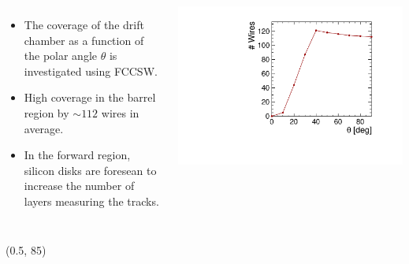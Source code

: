 \documentclass[final,xcolor={dvipsnames,svgnames,x11names,table}]{beamer}
\begin{document}
\begin{frame}
\begin{textblock}{39.5}
\begin{tcolorbox}[title=The simulation of the drift chamber with FCCSW]
\begin{columns}
    \end{columns}


    \begin{columns}
      \begin{itemize}
        \item The coverage of the drift chamber as a function of the polar angle $\theta$ is investigated using FCCSW.
        \item High coverage in the barrel region by $\sim 112$ wires in average.
        \item In the forward region, silicon disks are foresean to increase the number of layers measuring the tracks.
      \end{itemize}

        \centering
        \includegraphics[width=\textwidth]{Figures/numWires}
    \end{columns}

  \end{tcolorbox}
\end{textblock}



\begin{textblock}{43}(0.5, 85)
  \begin{tcolorbox}[title=Beam-induced backgrounds and the impact on the drift chamber]


\end{tcolorbox}
\end{textblock}
\end{frame}
\end{document}
